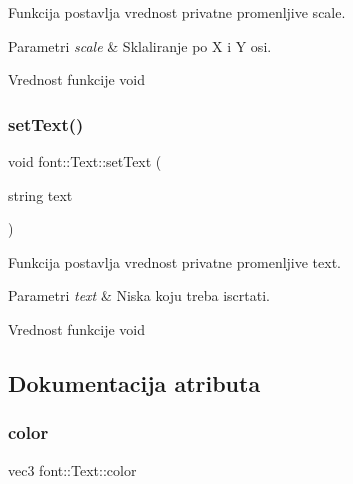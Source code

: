 Funkcija postavlja vrednost privatne promenljive scale. 


\begin{DoxyParams}{Parametri}
{\em scale} & Sklaliranje po X i Y osi. \\
\hline
\end{DoxyParams}
\begin{DoxyReturn}{Vrednost funkcije}
void 
\end{DoxyReturn}
\mbox{\label{classfont_1_1Text_a3eae0fce16f5ea89ae3b0fae55cf3e93}} 
\subsubsection{\texorpdfstring{set\+Text()}{setText()}}
{\footnotesize\ttfamily void font\+::\+Text\+::set\+Text (\begin{DoxyParamCaption}\item[{string}]{text }\end{DoxyParamCaption})}



Funkcija postavlja vrednost privatne promenljive text. 


\begin{DoxyParams}{Parametri}
{\em text} & Niska koju treba iscrtati. \\
\hline
\end{DoxyParams}
\begin{DoxyReturn}{Vrednost funkcije}
void 
\end{DoxyReturn}


\subsection{Dokumentacija atributa}
\mbox{\label{classfont_1_1Text_a83c69eadc420a466aaade60393f35b24}} 
\subsubsection{\texorpdfstring{color}{color}}
{\footnotesize\ttfamily vec3 font\+::\+Text\+::color\hspace{0.3cm}{\ttfamily [private]}}



